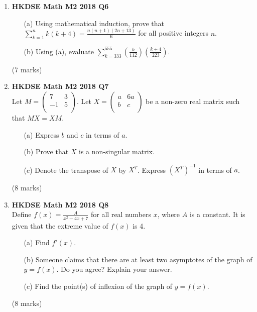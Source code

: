 \documentclass[12pt]{article}
\begin{document}
\begin{enumerate}
	\item \textbf{HKDSE Math M2 2018 Q6}
	\begin{enumerate}
		\item [(a)]Using mathematical induction, prove that $\displaystyle \sum_{k = 1}^{n} k(k+4) = \frac{n(n+1)(2n+13)}{6}$ for all positive integers $n$.
		\item [(b)] Using (a), evaluate $\displaystyle \sum_{k = 333}^{555} \left(\frac{k}{112}\right)\left(\frac{k+4}{223}\right)$.
	\end{enumerate}
	(7 marks)

	\item \textbf{HKDSE Math M2 2018 Q7}\\
	Let $M = 
		\begin{pmatrix}
		7 &3 \\
		-1&5\\
		\end{pmatrix}$. Let $X = 
		\begin{pmatrix}
		a &6a \\
		b&c\\
		\end{pmatrix}$ be a non-zero real matrix such that $MX = XM$. 
	\begin{enumerate}
		\item[(a)]Express $b$ and $c$ in  terms of $a$. 
		\item[(b)]Prove that $X$ is a non-singular matrix.
		\item[(c)]Denote the transpose of $X$ by $X^T$. Express $(X^T)^{-1}$ in terms of $a$.
	\end{enumerate}
	(8 marks)

	\item \textbf{HKDSE Math M2 2018 Q8}\\
	Define $f(x) = \displaystyle \frac{A}{x^2-4x+7}$ for all real numbers $x$, where $A$ is a constant. It is given that the extreme value of $f(x)$ is 4. 
	\begin{enumerate}
		\item [(a)] Find $f'(x)$. 
		\item [(b)] Someone claims that there are at least two asymptotes of the graph of $ y =  f(x)$. Do you agree? Explain your answer. 
		\item [(c)] Find the point(s) of inflexion of the graph of $y =f(x)$.
	\end{enumerate}
	(8 marks)


\end{enumerate}
\end{document}
